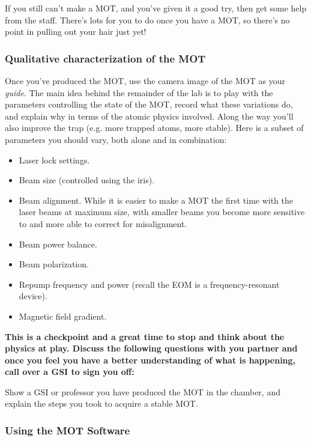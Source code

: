 \documentclass{../lab}
\begin{document}
If you still can't make a MOT, and you've given it a good try, then get some help from the staff. There's lots for you to do once you have a MOT, so there's no point in pulling out your hair just yet!

\subsubsection{Qualitative characterization of the MOT}

Once you've produced the MOT, use the camera image of the MOT as your \emph{guide}. The main idea behind the remainder of the lab is to play with the parameters controlling the state of the MOT, record what these variations do, and explain why in terms of the atomic physics involved. Along the way you'll also improve the trap (e.g. more trapped atoms, more stable). Here is a subset of parameters you should vary, both alone and in combination:

\begin{itemize}
    \item Laser lock settings.

    \item Beam size (controlled using the iris).

    \item Beam alignment. While it is easier to make a MOT the first time with the laser beams at maximum size, with smaller beams you become more sensitive to and more able to correct for misalignment.

    \item Beam power balance.

    \item Beam polarization.

    \item Repump frequency and power (recall the EOM is a frequency-resonant device).

    \item Magnetic field gradient.
\end{itemize}

\textbf{This is a checkpoint and a great time to stop and think about the physics at play. Discuss the following questions with you partner and once you feel you have a better understanding of what is happening, call over a GSI to sign you off:}

Show a GSI or professor you have produced the MOT in the chamber, and explain the steps you took to acquire a stable MOT.

\subsubsection{Using the MOT Software}
\end{document}
